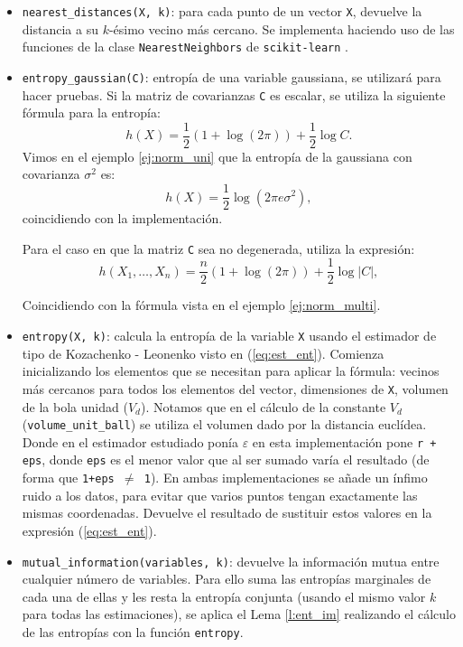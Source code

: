 \documentclass[12pt,a4paper]{report} %
\theoremstyle{definition}
\begin{document}
\begin{itemize}
\item \texttt{nearest\_distances(X, k)}: para cada punto de un vector \texttt{X}, devuelve la distancia a su $k$-ésimo vecino más cercano. Se implementa haciendo uso de las funciones de la clase \texttt{NearestNeighbors} de \texttt{scikit-learn} \cite{nearestneighbors}.

\item \texttt{entropy\_gaussian(C)}: entropía de una variable gaussiana, se utilizará para hacer pruebas. Si la matriz de covarianzas \texttt{C} es escalar, se utiliza la siguiente fórmula para la entropía:\[
  h(X) = \frac{1}{2}\left ( 1 + \log(2\pi) \right )+ \frac{1}{2} \log C.
  \]
Vimos en el ejemplo \ref{ej:norm_uni} que la entropía de la gaussiana con covarianza $\sigma^2$ es:\[
h(X) = \frac{1}{2}\log (2\pi e \sigma^2 ),
\]
coincidiendo con la implementación.

Para el caso en que la matriz \texttt{C} sea no degenerada, utiliza la expresión:\[
h(X_1,\dots, X_n) = \frac{n}{2} \left (1 + \log(2\pi) \right) + \frac{1}{2}\log |C|,
\]

Coincidiendo con la fórmula vista en el ejemplo \ref{ej:norm_multi}.

\item \texttt{entropy(X, k)}: calcula la entropía de la variable \texttt{X} usando el estimador de tipo de Kozachenko - Leonenko visto en  (\ref{eq:est_ent}). Comienza inicializando los elementos que se necesitan para aplicar la fórmula: vecinos más cercanos para todos los elementos del vector, dimensiones de \texttt{X}, volumen de la bola unidad ($V_d$). Notamos que en el cálculo de la constante $V_d$ (\texttt{volume\_unit\_ball}) se utiliza el volumen dado por la distancia euclídea. Donde en el estimador estudiado ponía $\varepsilon$ en esta implementación pone \texttt{r + eps}, donde \texttt{eps} es el menor valor que al ser sumado varía el resultado (de forma que  \texttt{1+eps $\neq$ 1}). En ambas implementaciones se añade un ínfimo ruido a los datos, para evitar que varios puntos tengan exactamente las mismas coordenadas. Devuelve el resultado de sustituir estos valores en la expresión (\ref{eq:est_ent}).

\item \texttt{mutual\_information(variables, k)}: devuelve la información mutua entre cualquier número de variables. Para ello suma las entropías marginales de cada una de ellas y les resta la entropía conjunta (usando el mismo valor $k$ para todas las estimaciones), se aplica el Lema \ref{l:ent_im} realizando el cálculo de las entropías con la función \texttt{entropy}.


\end{itemize}
\end{document}
